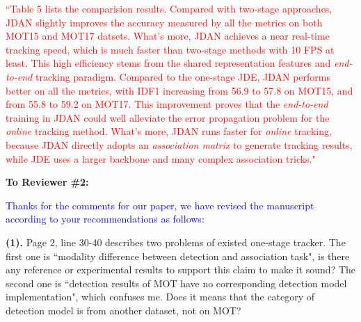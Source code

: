 \documentclass[12pt,journal,onecolumn]{IEEEtran}
\begin{document}
\textcolor{red}{
``Table 5 lists the comparision results.
Compared with two-stage approaches, JDAN slightly improves the accuracy measured by all the metrics on both MOT15 and MOT17 datsets.
What's more, JDAN achieves a near real-time tracking speed, which is much faster than two-stage methods with 10 FPS at least.
This high efficiency stems from the shared representation features and \emph{end-to-end} tracking paradigm.
Compared to the one-stage JDE, JDAN performs better on all the metrics, with IDF1 increasing from 56.9 to 57.8 on MOT15, and from 55.8 to 59.2 on MOT17.
This improvement proves that the \emph{end-to-end} training in JDAN could well alleviate the error propagation problem for the \emph{online} tracking method.
What's more, JDAN runs faster for \emph{online} tracking, because JDAN directly adopts an \emph{association matrix} to generate tracking results, while JDE uses a larger backbone and many complex association tricks." \\
}



\vspace{8pt}


\vspace{8pt}

\newpage





\textbf{To Reviewer \#2:}

\textcolor{blue}{Thanks for the comments for our paper, we have revised the manuscript according to your recommendations as follows:}

\textbf{(1).}  Page 2, line 30-40 describes two problems of existed one-stage tracker. 
The first one is ``modality difference between detection and association task", is there any reference or experimental results to support this claim to make it sound?  
The second one is ``detection results of MOT have no corresponding detection model implementation", which confuses me. 
Does it means that the category of detection model is from another dataset, not on MOT?
\end{document}
